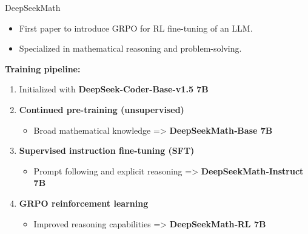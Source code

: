 \documentclass[9pt]{beamer}
\begin{document}
\begin{frame}{DeepSeekMath}

\begin{itemize}\setlength\itemsep{0.3em}
  \item First paper to introduce GRPO for RL fine-tuning of an LLM.
  \vspace{0.5em}
  \item Specialized in mathematical reasoning and problem-solving.
\end{itemize}

\pause
\vfill
\textbf{Training pipeline:}
\begin{enumerate}

  \item Initialized with \textbf{DeepSeek-Coder-Base-v1.5 7B} \cite{guo2024deepseekcoderlargelanguagemodel}

  \vspace{0.5em}
  \item \textbf{Continued pre-training (unsupervised)}  
  \vspace{0.5em}
    \begin{itemize}
        \item Broad mathematical knowledge => \textbf{DeepSeekMath‑Base 7B}
    \end{itemize}

  \vspace{0.5em}
  \item \textbf{Supervised instruction fine-tuning (SFT)}  
    \begin{itemize}
        \item Prompt following and explicit reasoning => \textbf{DeepSeekMath‑Instruct 7B}
    \end{itemize}

  \vspace{0.5em}
  \item \textbf{GRPO reinforcement learning}  
    \begin{itemize}
        \item Improved reasoning capabilities => \textbf{DeepSeekMath‑RL 7B}
    \end{itemize}

\end{enumerate}\setlength\itemsep{0.45em}
\end{frame}
\end{document}
